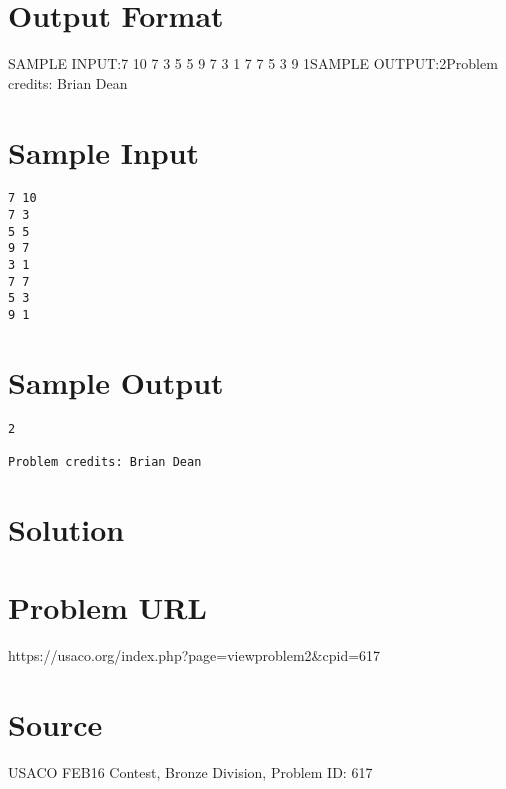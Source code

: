 \documentclass[12pt]{article}
\begin{document}
\section*{Output Format}
SAMPLE INPUT:7 10
7 3
5 5
9 7
3 1
7 7
5 3
9 1SAMPLE OUTPUT:2Problem credits: Brian Dean

\section*{Sample Input}
\begin{verbatim}
7 10
7 3
5 5
9 7
3 1
7 7
5 3
9 1
\end{verbatim}

\section*{Sample Output}
\begin{verbatim}
2

Problem credits: Brian Dean
\end{verbatim}

\section*{Solution}


\section*{Problem URL}
https://usaco.org/index.php?page=viewproblem2&cpid=617

\section*{Source}
USACO FEB16 Contest, Bronze Division, Problem ID: 617
\end{document}
